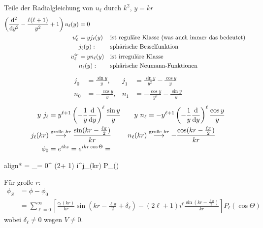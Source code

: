 	Teile der Radialgleichung von $u_\ell$ durch $k^2$, $y=kr$ 
		\begin{align*}
			\left( \frac{\mathrm{d}^2}{\mathrm{d} y^2} - \frac{\ell(\ell+1)}{y^2} + 1
			\right) u_\ell (y) &= 0 \\
			u_\ell^r &= y j_\ell (y) & & \text{ist reguläre Klasse (was auch immer das bedeutet)} \\
			&j_\ell (y) : & &\text{sphärische Besselfunktion} \\
			u_\ell^{ir} &= y n_\ell(y) & &\text{ist irreguläre Klasse}\\
			&n_\ell(y) : & &\text{sphärische Neumann-Funktionen}
		\end{align*}
		\begin{align*}
			j_0 &= \frac{\sin y}{y} ,& j_1 &= \frac{\sin y}{y^2}- \frac{\cos y}{y} \\
			n_0 &= -\frac{\cos y}{y} ,& n_1 &= -\frac{\cos y}{y^2} - \frac{\sin y}{y}
		\end{align*}
		\begin{align*}
			y ~j_\ell &= y^{\ell + 1} \left(-\frac{1}{y} \frac{\mathrm{d}}{\mathrm{d} y}\right)^\ell 
			\frac{\sin y}{y} &
			y ~n_\ell &= - y^{\ell+1} \left(-\frac{1}{y} \frac{\mathrm{d}}{\mathrm{d} y}\right)^\ell
			\frac{\cos y}{y}\\
			j_\ell(kr) &\overset{\text{große }kr}{\longrightarrow} 
			\frac{\sin(kr-\frac{\ell \pi}{2})}{kr} &
			n_\ell(kr) &\overset{\text{große }kr}{\longrightarrow} 
			- \frac{\cos(kr-\frac{\ell \pi}{2})}{kr} \\
			\phi_0 &= e^{ikz} = e^{ikr \cos \Theta} =
		\end{align*}
		\begin{empheq}[box=\boxed]{align*}
			= \sum_{\ell = 0}^{\infty} (2\ell + 1) i^\ell j_\ell(kr) P_\ell (\cos \Theta)
		\end{empheq}
	Für große $r$:
		\begin{align*}	
			\phi_S &= \phi - \phi_0 \\
			&= \sum_{\ell = 0}^{\infty} 
			\left[ \frac{c_\ell(kr)}{kr} \sin \left(kr-\frac{\ell \pi}{2} + \delta_\ell \right)
				-(2\ell +1)i^\ell \frac{\sin \left(kr-\frac{\ell \pi}{2}\right)}{kr}
			\right] P_\ell (\cos \Theta)
		\end{align*}
	wobei $\delta_\ell \neq 0$ wegen $V \neq 0$.
	

